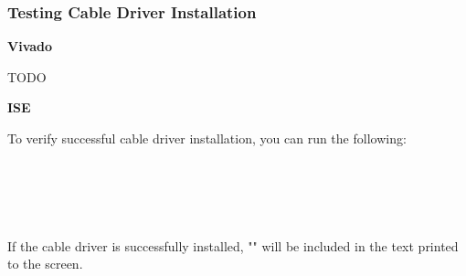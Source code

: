 \subsubsection{Testing Cable Driver Installation}
\textbf{Vivado}
\begin{flushleft}
TODO
\end{flushleft}
\textbf{ISE}
\begin{flushleft}
To verify successful cable driver installation, you can run the following:\\
 \\
 \\
 \\
 \\
 \\
If the cable driver is successfully installed, "" will be included in the text printed to the screen.
%
%
%
%
%
\end{flushleft}
\pagebreak

